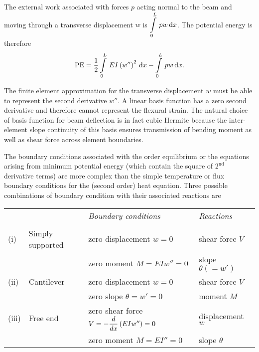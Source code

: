The external work associated with forces $p$ acting normal to the beam and
moving through a transverse displacement $w$ is $\gint{0}{L}{pw}{x}$.
The potential energy is therefore
\begin{equation}
  \text{PE}=\dfrac{1}{2} \gint{0}{L}{EI\pbrac{w''}^{2}}{x} - \gint{0}{L}{pw}{x}.
  \label{eqn:poten}
\end{equation}

The finite element approximation for the transverse displacement $w$ must be
able to represent the second derivative $w''$. A linear basis function has a
zero second derivative and therefore cannot represent the flexural strain. The
natural choice of basis function for beam deflection is in fact cubic Hermite
because the inter-element slope continuity of this basis ensures transmission
of bending moment as well as shear force across element boundaries.

The boundary conditions associated with the  order equilibrium
 or the equations arising from minimum potential energy
 (which contain the square of $2^{\text{nd}}$ derivative terms) 
are more complex than the simple temperature or flux boundary conditions for the
(second order) heat equation. Three possible combinations of boundary
condition with their associated reactions are

\begin{tabular}{llll}
  && \emph{Boundary conditions} & \emph{Reactions}\\
  && \\
  (i) &  Simply supported &  zero displacement $w=0$ &  shear force $V$\\
  && zero moment $M = EIw'' = 0$ &  slope $\theta (= w')$\\
  (ii) &  Cantilever & zero displacement $w=0$ &  shear force $V$\\
  && zero slope  $\theta = w' = 0$ & moment $M$\\
  (iii)&  Free end & zero shear force $V=- \dfrac{ d  }{d x} \left( EIw'' \right) = 0$ & 
  displacement $w$\\
  && zero moment $M = EI'' = 0$ & slope $\theta$
\end{tabular}



%    


